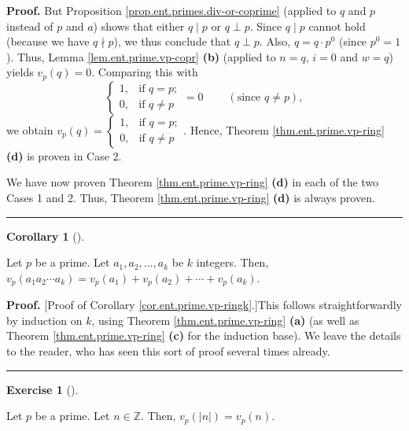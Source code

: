 \documentclass[numbers=enddot,12pt,final,onecolumn,notitlepage]{scrartcl}%
\newcounter{exer}
\numberwithin{exer}{subsection}
\theoremstyle{definition}
\newtheorem{coro}[theo]{Corollary}
\newenvironment{corollary}[1][]
{\begin{coro}[#1]\begin{leftbar}}
{\end{leftbar}\end{coro}}
\newtheorem{exmp}[exer]{Exercise}
\newenvironment{exercise}[1][]
{\begin{exmp}[#1]\begin{leftbar}}
{\end{leftbar}\end{exmp}}
\newenvironment{proof}[1][Proof]{\noindent\textbf{#1.} }{\ \rule{0.5em}{0.5em}}
\begin{document}
\begin{proof}
But Proposition \ref{prop.ent.primes.div-or-coprime} (applied to $q$ and $p$
instead of $p$ and $a$) shows that either $q\mid p$ or $q\perp p$. Since
$q\mid p$ cannot hold (because we have $q\nmid p$), we thus conclude that
$q\perp p$. Also, $q=q\cdot p^{0}$ (since $p^{0}=1$). Thus, Lemma
\ref{lem.ent.prime.vp-copr} \textbf{(b)} (applied to $n=q$, $i=0$ and $w=q$)
yields $v_{p}\left(  q\right)  =0$. Comparing this with
\[%
\begin{cases}
1, & \text{if }q=p;\\
0, & \text{if }q\neq p
\end{cases}
=0\ \ \ \ \ \ \ \ \ \ \left(  \text{since }q\neq p\right)  ,
\]
we obtain $v_{p}\left(  q\right)  =%
\begin{cases}
1, & \text{if }q=p;\\
0, & \text{if }q\neq p
\end{cases}
$. Hence, Theorem \ref{thm.ent.prime.vp-ring} \textbf{(d)} is proven in Case 2.

We have now proven Theorem \ref{thm.ent.prime.vp-ring} \textbf{(d)} in each of
the two Cases 1 and 2. Thus, Theorem \ref{thm.ent.prime.vp-ring} \textbf{(d)}
is always proven.
\end{proof}

\begin{corollary}
\label{cor.ent.prime.vp-ringk}Let $p$ be a prime. Let $a_{1},a_{2}%
,\ldots,a_{k}$ be $k$ integers. Then, $v_{p}\left(  a_{1}a_{2}\cdots
a_{k}\right)  =v_{p}\left(  a_{1}\right)  +v_{p}\left(  a_{2}\right)
+\cdots+v_{p}\left(  a_{k}\right)  $.
\end{corollary}

\begin{proof}
[Proof of Corollary \ref{cor.ent.prime.vp-ringk}.]This follows
straightforwardly by induction on $k$, using Theorem
\ref{thm.ent.prime.vp-ring} \textbf{(a)} (as well as Theorem
\ref{thm.ent.prime.vp-ring} \textbf{(c)} for the induction base). We leave the
details to the reader, who has seen this sort of proof several times already.
\end{proof}

\begin{exercise}
\label{exe.ent.prime.vp-abs}Let $p$ be a prime. Let $n\in\mathbb{Z}$. Then,
$v_{p}\left(  \left\vert n\right\vert \right)  =v_{p}\left(  n\right)  $.
\end{exercise}
\end{document}

